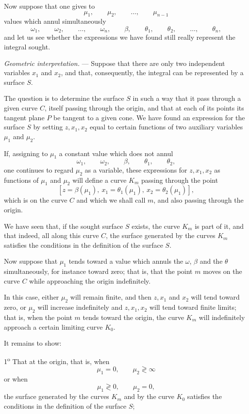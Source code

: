 \documentclass[11pt]{article}
\begin{document}
Now suppose that one gives to
\[
\mu_1,\qquad \mu_2,\qquad \ldots,\qquad \mu_{n-1}
\]
values which annul simultaneously
\[
\omega_1,\qquad \omega_2,\qquad \ldots,\qquad \omega_n,\qquad \beta,\qquad \theta_1,\qquad \theta_2,\qquad \ldots,\qquad \theta_n,
\]
and let us see whether the expressions we have found still really represent the integral sought.

\emph{Geometric interpretation.} --- Suppose that there are only two independent variables $x_1$ and $x_2$, and that, consequently, the integral can be represented by a surface $S$.

The question is to determine the surface $S$ in such a way that it pass through a given curve $C$, itself passing through the origin, and that at each of its points its tangent plane $P$ be tangent to a given cone. We have found an expression for the surface $S$ by setting $z,x_1,x_2$ equal to certain functions of two auxiliary variables $\mu_1$ and $\mu_2$.

If, assigning to $\mu_1$ a constant value which does not annul
\[
\omega_1,\qquad \omega_2,\qquad \beta,\qquad \theta_1,\qquad \theta_2,
\]
one continues to regard $\mu_2$ as a variable, these expressions for $z,x_1,x_2$ as functions of $\mu_1$ and $\mu_2$ will define a curve $K_m$ passing through the point
\[
[z=\beta(\mu_1),\ x_1=\theta_1(\mu_1),\ x_2=\theta_2(\mu_1)],
\]
which is on the curve $C$ and which we shall call $m$, and also passing through the origin.

We have seen that, if the sought surface $S$ exists, the curve $K_m$ is part of it, and that indeed, all along this curve $C$, the surface generated by the curves $K_m$ satisfies the conditions in the definition of the surface $S$.

Now suppose that $\mu_1$ tends toward a value which annuls the $\omega$, $\beta$ and the $\theta$ simultaneously, for instance toward zero; that is, that the point $m$ moves on the curve $C$ while approaching the origin indefinitely.

In this case, either $\mu_2$ will remain finite, and then $z,x_1$ and $x_2$ will tend toward zero, or $\mu_2$ will increase indefinitely and $z,x_1,x_2$ will tend toward finite limits; that is, when the point $m$ tends toward the origin, the curve $K_m$ will indefinitely approach a certain limiting curve $K_0$.

It remains to show:

1\textsuperscript{o} That at the origin, that is, when
\[
\mu_1=0,
\qquad
\mu_2\gtrless\infty
\]
or when
\[
\mu_1\gtrless0,
\qquad
\mu_2=0,
\]
the surface generated by the curves $K_m$ and by the curve $K_0$ satisfies the conditions in the definition of the surface $S$;
\end{document}
